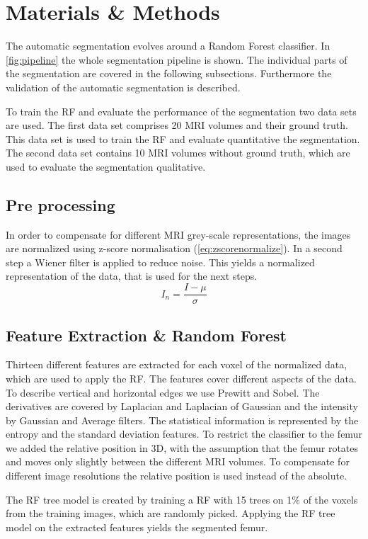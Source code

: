 \section{Materials \& Methods}
The automatic segmentation evolves around a Random Forest classifier. In \autoref{fig:pipeline} the whole segmentation pipeline is shown. The individual parts of the segmentation are covered in the following subsections. Furthermore the validation of the automatic segmentation is described.

To train the RF and evaluate the performance of the segmentation two data sets are used. The first data set comprises 20 MRI volumes and their ground truth. This data set is used to train the RF and evaluate quantitative the segmentation. The second data set contains 10 MRI volumes without ground truth, which are used to evaluate the segmentation qualitative.
\subsection{Pre processing}
In order to compensate for different MRI grey-scale representations, the images are normalized using z-score normalisation (\autoref{eq:zscorenormalize}). In a second step a Wiener filter is applied to reduce noise. This yields a normalized representation of the data, that is used for the next steps.
\begin{equation}
I_n = \frac{I - \mu}{\sigma}
\label{eq:zscorenormalize}
\end{equation}
\subsection{Feature Extraction \& Random Forest}
Thirteen different features are extracted for each voxel of the normalized data, which are used to apply the RF. The features cover different aspects of the data. To describe vertical and horizontal edges we use Prewitt and Sobel. The derivatives are covered by Laplacian and Laplacian of Gaussian and the intensity by Gaussian and Average filters. The statistical information is represented by the entropy and the standard deviation features. To restrict the classifier to the femur we added the relative position in 3D, with the assumption that the femur rotates and moves only slightly between the different MRI volumes. To compensate for different image resolutions the relative position is used instead of the absolute.

The RF tree model is created by training a RF with 15 trees on 1\% of the voxels from the training images, which are randomly picked. Applying the RF tree model on the extracted features yields the segmented femur.
